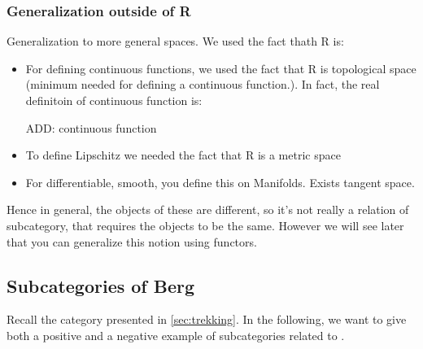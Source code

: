 {\subsubsection{Generalization outside of R}
Generalization to more general spaces. 
We used the fact thath R is:
\begin{itemize}
\item For defining continuous functions, we used the fact that R is topological space (minimum needed for defining a continuous function.). In fact, the real definitoin of continuous function is: 

ADD: continuous function

\item To define Lipschitz we needed the fact that R is a metric space 
\item For differentiable, smooth, you define this on Manifolds. Exists tangent space. 
\end{itemize}
     
Hence in general, the objects of these are different, so it's not really a relation of subcategory, that requires
the objects to be the same. However we will see later that you can generalize this notion using functors. 

}



\subsection{Subcategories of Berg}
Recall the category \Berg presented in \cref{sec:trekking}. In the following, we want to give both a positive and a negative example of subcategories related to \Berg.


